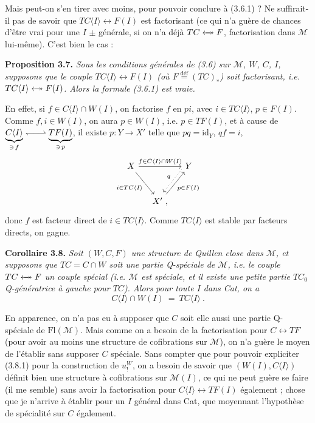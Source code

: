 \documentclass[11pt]{article}
\newcommand{\msp}[1]{\marginpar{\footnotesize [#1]}}
\newcommand{\M}{\mathcal{M}}
\newcommand{\Fl}{\mathrm{Fl}}
\newcommand{\id}{\mathrm{id}}
\newcommand{\deq}{\overset{\text{déf}}{=}}
\newcommand{\fact}{\mathrel{\leftarrow\mkern-11mu\twoheadrightarrow}}
\newcommand{\harp}{\mathrel{\leftharpoondown\joinrel\relbar\joinrel\rightharpoonup}}
\begin{document}
Mais peut-on s'en tirer avec moins, pour pouvoir conclure à (3.6.1) ? Ne suffirait-il pas de savoir que $TC\langle I\rangle\longleftrightarrow F(I)$ est factorisant (ce qui n'a guère de chances d'être vrai pour une $I$ $\pm$ générale, si on n'a déjà $TC\fact F$, factorisation dans $\M$ lui-même). C'est bien le cas :

\msp{page 41}
\textbf{Proposition 3.7.} \textit{Sous les conditions générales de \textup{(3.6)} sur $\M$, $W$, $C$, $I$, supposons que le couple $TC\langle I\rangle\longleftrightarrow F(I)$ (où $F\deq (TC)_*$) soit factorisant, i.e. $TC\langle I\rangle\fact F(I)$. Alors la formule \textup{(3.6.1)} est vraie.}

En effet, si $f\in C\langle I\rangle\cap W(I)$, on factorise $f$ en $pi$, avec $i\in TC\langle I\rangle$, $p\in F(I)$. Comme $f,i\in W(I)$, on aura $p\in W(I)$, i.e. $p\in TF(I)$, et à cause de $\underbrace{C\langle I\rangle}_{\ni\, f}\harp\underbrace{TF(I)}_{\ni\, p}$, il existe $p : Y\longrightarrow X'$ telle que $pq=\id_Y$, $qf=i$, %
\[
\begin{tikzcd}[column sep=small, row sep=large]
X \arrow[rr, "f\in C\langle I\rangle\cap W(I)"] \arrow[dr, "i\in TC\langle I\rangle"'] & & Y \arrow[dl, dotted, shift right=1ex, "q"'] \\
& X' \arrow[ur, "p\in F(I)"'] \ , &
\end{tikzcd}
\]
donc $f$ est facteur direct de $i\in TC\langle I\rangle$. Comme $TC\langle I\rangle$ est stable par facteurs directs, on gagne.

\textbf{Corollaire 3.8.} \textit{Soit $(W,C,F)$ une structure de Quillen close dans $\M$, et supposons que $TC=C\cap W$ soit une partie Q-spéciale de $\M$, i.e. le couple $TC\fact F$ un couple spécial (i.e. $\M$ est \textup{spéciale}, et il existe une petite partie $TC_0$ Q-génératrice à gauche pour $TC$). Alors pour toute $I$ dans \textup{Cat}, on a}
\[
C\langle I\rangle\cap W(I) \ = \ TC\langle I\rangle \ . \tag*{(3.8.1)}
\]

\msp{page 42}
En apparence, on n'a pas eu à supposer que $C$ soit elle aussi une partie Q-spéciale de $\Fl(\M)$. Mais comme on a besoin de la factorisation pour $C\longleftrightarrow TF$ (pour avoir au moins une structure de cofibrations sur $\M$), on n'a guère le moyen de l'établir sans supposer $C$ spéciale. Sans compter que pour pouvoir expliciter (3.8.1) pour la construction de $u^{W}_{!}$, on a besoin de savoir que $(W(I),C\langle I\rangle)$ définit bien une structure à cofibrations sur $\M(I)$, ce qui ne peut guère se faire (il me semble) sans avoir la factorisation pour $C\langle I\rangle\longleftrightarrow TF(I)$ également ; chose que je n'arrive à établir pour un $I$ général dans Cat, que moyennant l'hypothèse de spécialité sur $C$ également.
\end{document}
